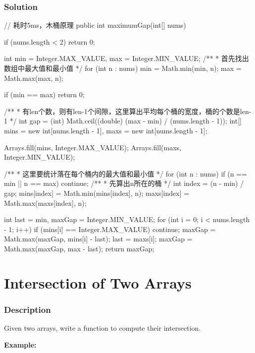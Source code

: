 \newpage
\subsubsection{Solution}

\begin{Code}
// 耗时5ms，木桶原理
public int maximumGap(int[] nums) {
    if (nums.length < 2) {
        return 0;
    }

    int min = Integer.MAX_VALUE, max = Integer.MIN_VALUE;
    /**
     * 首先找出数组中最大值和最小值
     */
    for (int n : nums) {
        min = Math.min(min, n);
        max = Math.max(max, n);
    }

    if (min == max) {
        return 0;
    }

    /**
     * 有len个数，则有len-1个间隙，这里算出平均每个桶的宽度，桶的个数是len-1
     */
    int gap = (int) Math.ceil((double) (max - min) / (nums.length - 1));
    int[] mins = new int[nums.length - 1], maxs = new int[nums.length - 1];

    Arrays.fill(mins, Integer.MAX_VALUE);
    Arrays.fill(maxs, Integer.MIN_VALUE);

    /**
     * 这里要统计落在每个桶内的最大值和最小值
     */
    for (int n : nums) {
        if (n == min || n == max) {
            continue;
        }
        /**
         * 先算出n所在的桶
         */
        int index = (n - min) / gap;
        mins[index] = Math.min(mins[index], n);
        maxs[index] = Math.max(maxs[index], n);
    }

    int last = min, maxGap = Integer.MIN_VALUE;
    for (int i = 0; i < nums.length - 1; i++) {
        if (mins[i] == Integer.MAX_VALUE) {
            continue;
        }
        maxGap = Math.max(maxGap, mins[i] - last);
        last = maxs[i];
    }
    maxGap = Math.max(maxGap, max - last);
    return maxGap;
}
\end{Code}

\newpage

\section{Intersection of Two Arrays} %

\subsubsection{Description}
Given two arrays, write a function to compute their intersection.

\textbf{Example:}

